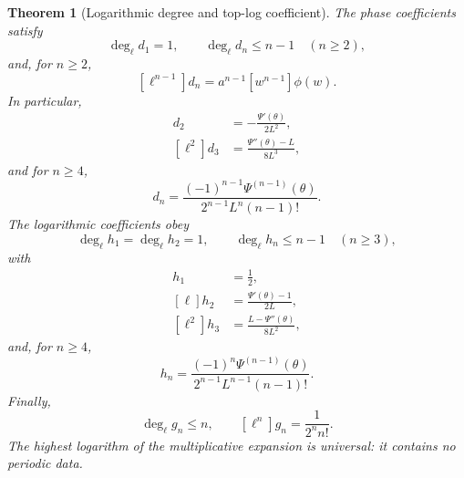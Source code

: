 \documentclass[11pt,oneside]{article}
\numberwithin{equation}{section}
\newtheorem{theorem}{Theorem}[section]
\theoremstyle{definition}
\theoremstyle{remark}
\begin{document}
\begin{theorem}[Logarithmic degree and top-log coefficient]
\label{thm:top-log}
The phase coefficients satisfy
\begin{equation}
 \deg_\ell d_1=1,
 \qquad
 \deg_\ell d_n\le n-1\quad(n\ge2),
 \label{eq:d-degree}
\end{equation}
and, for $n\ge2$,
\begin{equation}
 \boxed{
 [\ell^{n-1}]d_n=a^{n-1}[w^{n-1}]\phi(w).}
 \label{eq:d-top-log-general}
\end{equation}
In particular,
\begin{align}
 [\ell]d_2&=-\frac{\Psi'(\theta)}{2L^2},
 \label{eq:d2-top-log}\\
 [\ell^2]d_3&=\frac{\Psi''(\theta)-L}{8L^3},
 \label{eq:d3-top-log}
\end{align}
and for $n\ge4$,
\begin{equation}
 [\ell^{n-1}]d_n=
 \frac{(-1)^{n-1}\Psi^{(n-1)}(\theta)}
 {2^{n-1}L^n(n-1)!}.
 \label{eq:dn-top-log-nge4}
\end{equation}
The logarithmic coefficients obey
\begin{equation}
 \deg_\ell h_1=\deg_\ell h_2=1,
 \qquad
 \deg_\ell h_n\le n-1\quad(n\ge3),
 \label{eq:h-degree}
\end{equation}
with
\begin{align}
 [\ell]h_1&=\frac12,
 \label{eq:h1-top-log}\\
 [\ell]h_2&=\frac{\Psi'(\theta)-1}{2L},
 \label{eq:h2-top-log}\\
 [\ell^2]h_3&=\frac{L-\Psi''(\theta)}{8L^2},
 \label{eq:h3-top-log}
\end{align}
and, for $n\ge4$,
\begin{equation}
 [\ell^{n-1}]h_n=
 \frac{(-1)^n\Psi^{(n-1)}(\theta)}
 {2^{n-1}L^{n-1}(n-1)!}.
 \label{eq:hn-top-log-nge4}
\end{equation}
Finally,
\begin{equation}
 \deg_\ell g_n\le n,
 \qquad
 \boxed{[\ell^n]g_n=\frac1{2^n n!}.}
 \label{eq:gn-universal-top-log}
\end{equation}
The highest logarithm of the multiplicative expansion is universal: it contains no periodic data.
\end{theorem}
\end{document}
